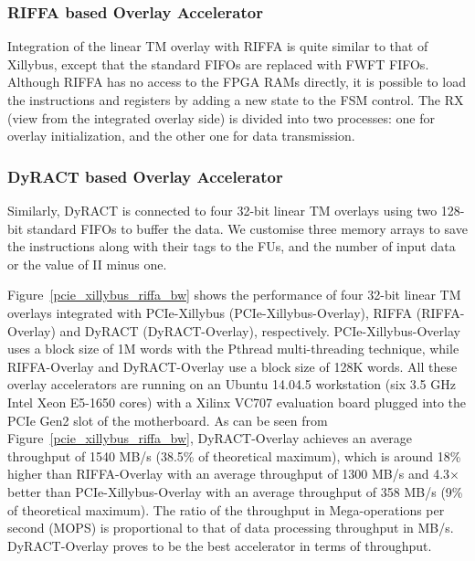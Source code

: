\subsubsection{RIFFA based Overlay Accelerator}
Integration of the linear TM overlay with RIFFA is quite similar to that of Xillybus, except that the standard FIFOs are replaced with FWFT FIFOs.  
Although RIFFA has no access to the FPGA RAMs directly, it is possible to load the instructions and registers by adding a new state to the FSM control. 
The RX (view from the integrated overlay side) is divided into two processes: one for overlay initialization, and the other one for data transmission. 

\subsubsection{DyRACT based Overlay Accelerator}
Similarly, DyRACT is connected to four 32-bit linear TM overlays using two 128-bit standard FIFOs to buffer the data. 
We customise three memory arrays to save the instructions along with their tags to the FUs, and the number of input data or the value of II minus one. 

Figure~\ref{pcie_xillybus_riffa_bw} shows the performance of four 32-bit linear TM overlays integrated with PCIe-Xillybus (PCIe-Xillybus-Overlay), RIFFA (RIFFA-Overlay) and DyRACT (DyRACT-Overlay), respectively. 
PCIe-Xillybus-Overlay uses a block size of 1M words with the Pthread multi-threading technique, while RIFFA-Overlay and DyRACT-Overlay use a block size of 128K words.
All these overlay accelerators are running on an Ubuntu 14.04.5 workstation (six 3.5 GHz Intel Xeon E5-1650 cores) with a Xilinx VC707 evaluation board plugged into the PCIe Gen2 slot of the motherboard. 
As can be seen from Figure~\ref{pcie_xillybus_riffa_bw}, DyRACT-Overlay achieves an average throughput of 1540 MB/s (38.5\% of theoretical maximum), which is around 18\% higher than RIFFA-Overlay with an average throughput of 1300 MB/s and 4.3$\times$ better than PCIe-Xillybus-Overlay with an average throughput of 358 MB/s (9\% of theoretical maximum). 
The ratio of the throughput in Mega-operations per second (MOPS) is proportional to that of data processing throughput in MB/s. 
DyRACT-Overlay proves to be the best accelerator in terms of throughput. 



